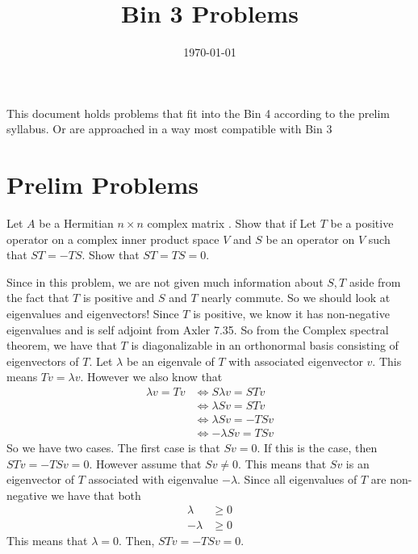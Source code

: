 \documentclass[answers]{exam}
\title{Bin 3 Problems}
\date{\today}
\author{}
\begin{document}
\maketitle
This document holds problems that fit into the Bin 4 according to the prelim syllabus. Or are approached 
in a way most compatible with Bin 3

\tableofcontents

\section{Prelim Problems}
\begin{questions}
    \question Let $A$ be a Hermitian $n\times n$ complex matrix . Show that if 
    \question Let $T$ be a positive operator on a complex inner product space $V$ and $S$ be an operator on $V$
    such that $ST = -TS$. Show that $ST=TS=0$.
    \begin{solution}
         Since in this problem, we are not given much information about $S,T$ aside from the
        fact that $T$ is positive and $S$ and $T$ nearly commute. So we should look at eigenvalues and 
        eigenvectors! Since $T$ is positive, we know it has non-negative eigenvalues and is self
        adjoint from Axler 7.35. So from the Complex spectral theorem, we have that $T$ is diagonalizable in an
        orthonormal basis consisting of eigenvectors of $T$. Let $\lambda$ be an eigenvale of $T$ with associated
        eigenvector $v$. This means $Tv = \lambda v$. However we also know that
        \begin{align*}
            \lambda v = Tv &\iff S\lambda v = STv\\
            &\iff \lambda Sv = STv \\
            &\iff \lambda Sv = -TSv\\
            &\iff -\lambda Sv = TSv
        \end{align*}
        So we have two cases. The first case is that $Sv = 0$. If this is the case, then $STv = -TSv = 0$.
        However assume that $Sv\neq 0$. This means that $Sv$ is an eigenvector of $T$ associated with eigenvalue
        $-\lambda$. Since all eigenvalues of $T$ are non-negative we have that both
        \begin{align*}
            \lambda &\geq 0 \\
            -\lambda&\geq 0
        \end{align*}
        This means that $\lambda = 0$. Then, $STv = -TSv = 0$.


\end{solution}
\end{questions}
\end{document}
